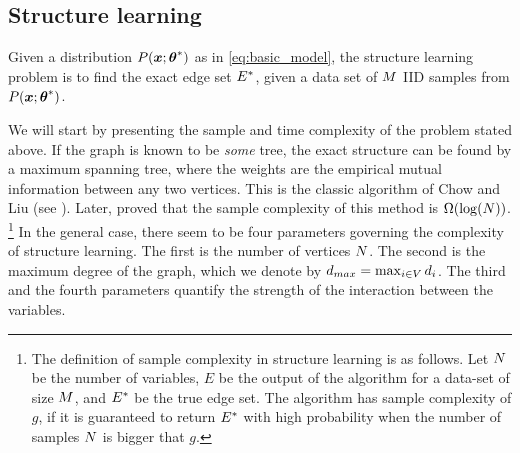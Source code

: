 \subsection{Structure learning}
\label{sec:structure}
Given a distribution $P(\boldsymbol{x};{\boldsymbol{\theta}}^{*})$ as in \eqref{eq:basic_model},
the structure learning problem is to find the exact edge set ${E}^{*}$, given a data set of $M$ IID samples from $P(\boldsymbol{x};{\boldsymbol{\theta}}^{*})$.

We will start by presenting the sample and time complexity of the problem stated above. 
If the graph is known to be {\em some} tree, the exact structure can be found by a maximum spanning tree, where the weights are the empirical mutual information between any two vertices. This is the classic algorithm of Chow and Liu (see \cite{chowLiu}). Later, \cite{tan2011large} proved that the sample complexity of this method is $\Omega(\log({N}))$.%
\footnote{The definition of sample complexity in structure learning is as follows. Let $N$ be the number of variables, $E$ be the output of the algorithm for a data-set of size $M$, and ${E}^{*}$ be the true edge set. The algorithm has sample complexity of $g$, if it is guaranteed to return ${E}^{*}$ with high probability when the number of samples $N$ is bigger that $g$.}
In the general case, there seem to be four parameters governing the complexity of structure learning.
The first is the number of vertices $N$.
The second is the maximum degree of the graph, which we denote by $d_{max} = \max_{i \in V} d_i$.
The third and the fourth parameters quantify the strength of the interaction between the variables.

